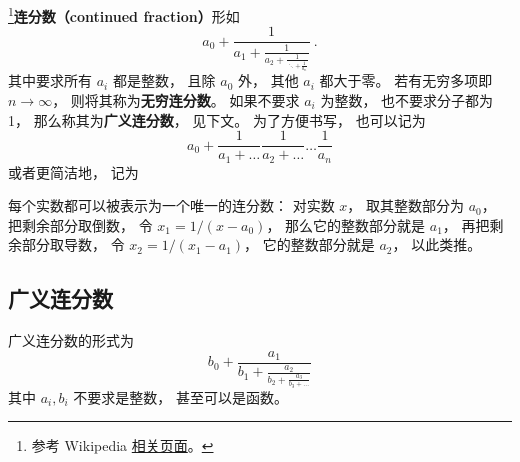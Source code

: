 
\footnote{参考 Wikipedia \href{https://en.wikipedia.org/wiki/Continued_fraction}{相关页面}。}\textbf{连分数（continued fraction）}形如
\begin{equation}
a_0 + \frac{1}{\displaystyle a_1 + \frac{1}{\displaystyle a_2 + \frac{1}{\displaystyle \ddots + \frac{1}{a_n}}}}~.
\end{equation}
其中要求所有 $a_i$ 都是整数， 且除 $a_0$ 外， 其他 $a_i$ 都大于零。 若有无穷多项即 $n\to\infty$， 则将其称为\textbf{无穷连分数}。 如果不要求 $a_i$ 为整数， 也不要求分子都为 1， 那么称其为\textbf{广义连分数}， 见下文。 为了方便书写， 也可以记为
\begin{equation}
a_0 + \frac{1}{a_1 + \dots}\frac{1}{a_2 + \dots}\dots \frac{1}{a_n}
\end{equation}
或者更简洁地， 记为
\begin{equation}
[a_0;\ a_1,\ a_2,\ \dots\ ,\ a_n]
\end{equation}

每个实数都可以被表示为一个唯一的连分数： 对实数 $x$， 取其整数部分为 $a_0$， 把剩余部分取倒数， 令 $x_1 = 1/(x-a_0)$， 那么它的整数部分就是 $a_1$， 再把剩余部分取导数， 令 $x_2 = 1/(x_1 - a_1)$， 它的整数部分就是 $a_2$， 以此类推。

\subsection{广义连分数}
广义连分数的形式为
\begin{equation}
b_0 + \frac{a_1}{\displaystyle b_1 + \frac{a_2}{\displaystyle b_2 + \frac{a_3}{\displaystyle b_3 + \dots}}}
\end{equation}
其中 $a_i, b_i$ 不要求是整数， 甚至可以是函数。
